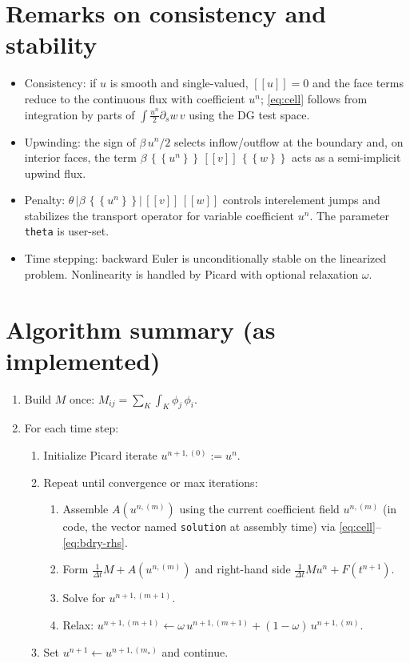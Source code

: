 \documentclass[11pt]{article}
\newcommand{\avg}[1]{\left\{\!\!\left\{#1\right\}\!\!\right\}}
\newcommand{\jump}[1]{\left[\!\left[#1\right]\!\right]}
\newcommand{\dt}{\Delta t}
\newcommand{\Kh}{K}
\begin{document}
\section{Remarks on consistency and stability}
\begin{itemize}
  \item Consistency: if $u$ is smooth and single-valued, $\jump{u}=0$ and the face terms reduce to the continuous flux with coefficient $u^n$; \eqref{eq:cell} follows from integration by parts of $\int \tfrac{u^n}{2}\partial_s w\, v$ using the DG test space.
  \item Upwinding: the sign of $\beta\,u^n/2$ selects inflow/outflow at the boundary and, on interior faces, the term $\beta\,\avg{u^n}\,\jump{v}\,\avg{w}$ acts as a semi-implicit upwind flux.
  \item Penalty: $\theta\,|\beta\,\avg{u^n}|\,\jump{v}\,\jump{w}$ controls interelement jumps and stabilizes the transport operator for variable coefficient $u^n$. The parameter \texttt{theta} is user-set.
  \item Time stepping: backward Euler is unconditionally stable on the linearized problem. Nonlinearity is handled by Picard with optional relaxation $\omega$.
\end{itemize}

\section{Algorithm summary (as implemented)}
\begin{enumerate}
  \item Build $M$ once: $M_{ij}=\sum_\Kh\int_\Kh \phi_j\,\phi_i$.
  \item For each time step:
    \begin{enumerate}
      \item Initialize Picard iterate $u^{n+1,(0)}:=u^{n}$.
      \item Repeat until convergence or max iterations:
        \begin{enumerate}
          \item Assemble $A(u^{n,(m)})$ using the current coefficient field $u^{n,(m)}$ (in code, the vector named \texttt{solution} at assembly time) via \eqref{eq:cell}--\eqref{eq:bdry-rhs}.
          \item Form $\frac{1}{\dt}M + A(u^{n,(m)})$ and right-hand side $\frac{1}{\dt}Mu^{n} + F(t^{n+1})$.
          \item Solve for $u^{n+1,(m+1)}$.
          \item Relax: $u^{n+1,(m+1)} \leftarrow \omega\,u^{n+1,(m+1)} + (1-\omega)\,u^{n+1,(m)}$.
        \end{enumerate}
      \item Set $u^{n+1}\gets u^{n+1,(m_\star)}$ and continue.
    \end{enumerate}
\end{enumerate}
\end{document}
